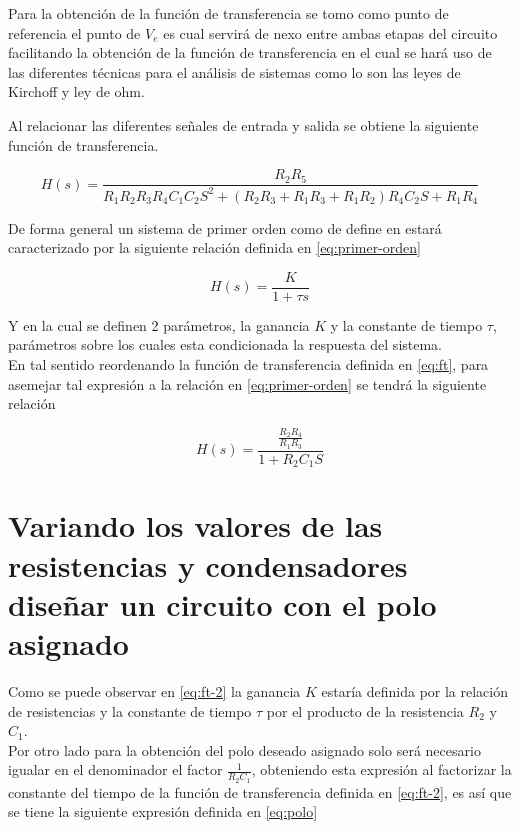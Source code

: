 \documentclass[conference]{IEEEtran}
\begin{document}
	Para la obtención de la función de transferencia se tomo como punto de referencia el punto de $V_e$ es cual servirá de nexo entre ambas etapas del circuito facilitando la obtención de la función de transferencia en el cual se hará uso de las diferentes técnicas para el análisis de sistemas como lo son las leyes de Kirchoff y ley de ohm.
	
	Al relacionar las diferentes señales de entrada y salida se obtiene la siguiente función de transferencia.
		 
	\begin{equation}
		H(s) = \frac{R_2 R_5}{R_1 R_2 R_3 R_4 C_1 C_2 S^2 + (R_2 R_3 + R_1 R_3 + R_1 R_2)R_4 C_2 S + R_1 R_4}
		\label{eq:ft}
	\end{equation}
	
	De forma general un sistema de primer orden como de define en \cite{ogata2015} estará caracterizado por la siguiente relación definida en \ref{eq:primer-orden}
	
	\begin{equation}
		H(s) = \frac{K}{1 + \tau s }
		\label{eq:primer-orden}
	\end{equation}
	
	Y en la cual se definen 2 parámetros, la ganancia $K$ y la constante de tiempo $\tau$, parámetros sobre los cuales esta condicionada la respuesta del sistema. \\
	
	En tal sentido reordenando la función de transferencia definida en \ref{eq:ft}, para asemejar tal expresión a la relación en \ref{eq:primer-orden} se tendrá la siguiente relación
	
	\begin{equation}
		H(s) = \frac{ \frac{R_2 R_4}{R_1 R_3} }{1 + R_2 C_1 S}
		\label{eq:ft-2}
	\end{equation}
	
	\section{Variando los valores de las resistencias y condensadores diseñar un circuito con el polo asignado}
	
	Como se puede observar en \ref{eq:ft-2} la ganancia $K$ estaría definida por la relación de resistencias y la constante de tiempo $\tau$ por el producto de la resistencia $R_2$ y $C_1$. \\
	
	Por otro lado para la obtención del polo deseado asignado solo será necesario igualar en el denominador el factor $\frac{1}{R_2 C_1}$, obteniendo esta expresión al factorizar la constante del tiempo de la función de transferencia definida en \ref{eq:ft-2}, es así que se tiene la siguiente expresión definida en \ref{eq:polo}
	
\end{document}
